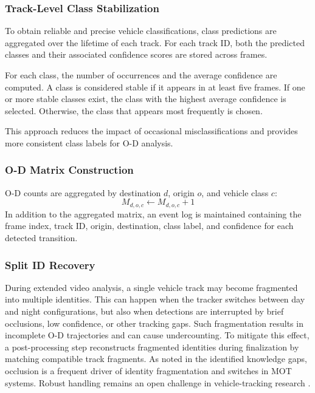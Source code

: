 \subsubsection{Track-Level Class Stabilization}
\label{sec:method_class_stabilization}

To obtain reliable and precise vehicle classifications, class predictions are aggregated over the lifetime of each track. For each track ID, both the predicted classes and their associated confidence scores are stored across frames.

For each class, the number of occurrences and the average confidence are computed. A class is considered stable if it appears in at least five frames. If one or more stable classes exist, the class with the highest average confidence is selected. Otherwise, the class that appears most frequently is chosen.

This approach reduces the impact of occasional misclassifications and provides more consistent class labels for O-D analysis.

\subsubsection{O-D Matrix Construction}
\label{sec:method_od_matrix}

O-D counts are aggregated by destination $d$, origin $o$, and vehicle class $c$:
\begin{equation}
M_{d,o,c} \leftarrow M_{d,o,c} + 1
\label{eq:count-matrix-update}
\end{equation}
In addition to the aggregated matrix, an event log is maintained containing the frame index, track ID, origin, destination, class label, and confidence for each detected transition.

\subsubsection{Split ID Recovery}
\label{sec:method_split_id_recovery}

During extended video analysis, a single vehicle track may become fragmented into multiple identities. This can happen when the tracker switches between day and night configurations, but also when detections are interrupted by brief occlusions, low confidence, or other tracking gaps. Such fragmentation results in incomplete O-D trajectories and can cause undercounting. To mitigate this effect, a post-processing step reconstructs fragmented identities during finalization by matching compatible track fragments. As noted in the identified knowledge gaps, occlusion is a frequent driver of identity fragmentation and switches in MOT systems. Robust handling remains an open challenge in vehicle-tracking research \citep{Hassan2024}.

